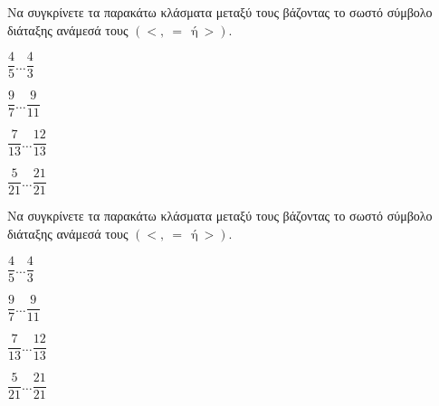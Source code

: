 Να συγκρίνετε τα παρακάτω κλάσματα μεταξύ τους βάζοντας το σωστό σύμβολο διάταξης ανάμεσά τους $ (<,\ =\ \ \textrm{ή}\ >) $.
\begin{multicols}{3}
\begin{rlist}[leftmargin=3mm]
\item $ \dfrac{4}{5}\ldots \dfrac{4}{3} $
\item $ \dfrac{9}{7}\ldots \dfrac{9}{11} $
\item $ \dfrac{7}{13}\ldots \dfrac{12}{13} $
\item $ \dfrac{5}{21}\ldots \dfrac{21}{21} $
\end{rlist}
\end{multicols}
Να συγκρίνετε τα παρακάτω κλάσματα μεταξύ τους βάζοντας το σωστό σύμβολο διάταξης ανάμεσά τους $ (<,\ =\ \ \textrm{ή}\ >) $.
\begin{multicols}{3}
\begin{rlist}[leftmargin=3mm]
\item $ \dfrac{4}{5}\ldots \dfrac{4}{3} $
\item $ \dfrac{9}{7}\ldots \dfrac{9}{11} $
\item $ \dfrac{7}{13}\ldots \dfrac{12}{13} $
\item $ \dfrac{5}{21}\ldots \dfrac{21}{21} $
\end{rlist}
\end{multicols}
